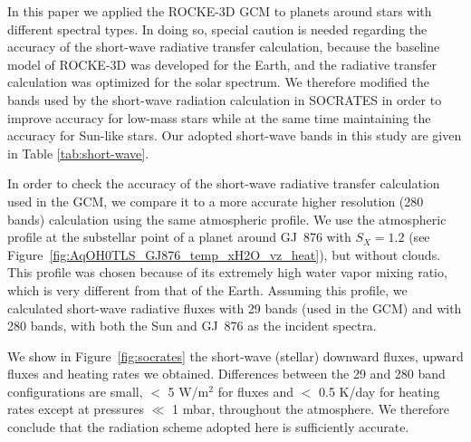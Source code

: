 \documentclass[11pt,numberedappendix,twocolappendix,]{emulateapj}
\def\wv{water vapor}
\begin{document}
In this paper we applied the ROCKE-3D GCM to planets around stars with different spectral types. 
In doing so, special caution is needed regarding the accuracy of the short-wave radiative transfer calculation, because the baseline model of ROCKE-3D was  developed for the Earth, and the radiative transfer calculation was optimized for the solar spectrum. 
We therefore modified the bands used by the short-wave radiation calculation in SOCRATES in order to improve accuracy for low-mass stars while at the same time maintaining the accuracy for Sun-like stars.
Our adopted short-wave bands in this study are given in Table \ref{tab:short-wave}.

In order to check the accuracy of the short-wave radiative transfer calculation used in the GCM, we compare it to a more accurate higher resolution (280 bands) calculation using the same atmospheric profile. 
We use the atmospheric profile at the substellar point of a planet around GJ~876 with $S_X=1.2$ (see Figure~\ref{fig:AqOH0TLS_GJ876_temp_xH2O_vz_heat}), but without clouds. 
This profile was chosen because of its extremely high \wv{} mixing ratio, which is very different from that of the Earth. 
Assuming this profile, we calculated short-wave radiative fluxes with 29 bands (used in the GCM) and with 280 bands, with both the Sun and GJ~876 as the incident spectra.

We show in Figure~\ref{fig:socrates} the short-wave (stellar) downward fluxes, upward fluxes and heating rates we obtained.
Differences between the 29 and 280 band configurations are small, $<$ 5 W/m$^2$ for fluxes and $<$ 0.5 K/day for heating rates except at pressures $\ll$ 1 mbar, throughout the atmosphere. We therefore conclude that the radiation scheme adopted here is sufficiently accurate.
\end{document}
